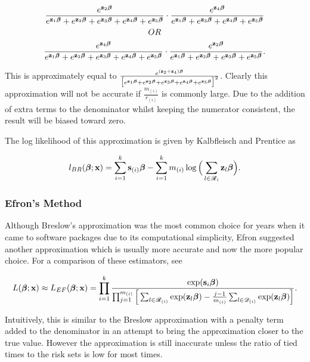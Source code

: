 \begin{gather*}
    \frac{e^{\textbf{z}_2\boldsymbol{\beta}}}{e^{\textbf{z}_1\boldsymbol{\beta}}+e^{\textbf{z}_2\boldsymbol{\beta}}+e^{\textbf{z}_3\boldsymbol{\beta}}+e^{\textbf{z}_4\boldsymbol{\beta}}+e^{\textbf{z}_5\boldsymbol{\beta}}}\cdot\frac{e^{\textbf{z}_4\boldsymbol{\beta}}}{e^{\textbf{z}_1\boldsymbol{\beta}}+e^{\textbf{z}_3\boldsymbol{\beta}}+e^{\textbf{z}_4\boldsymbol{\beta}}+e^{\textbf{z}_5\boldsymbol{\beta}}}\\
    OR\\
    \frac{e^{\textbf{z}_4\boldsymbol{\beta}}}{e^{\textbf{z}_1\boldsymbol{\beta}}+e^{\textbf{z}_2\boldsymbol{\beta}}+e^{\textbf{z}_3\boldsymbol{\beta}}+e^{\textbf{z}_4\boldsymbol{\beta}}+e^{\textbf{z}_5\boldsymbol{\beta}}}\cdot\frac{e^{\textbf{z}_2\boldsymbol{\beta}}}{e^{\textbf{z}_1\boldsymbol{\beta}}+e^{\textbf{z}_2\boldsymbol{\beta}}+e^{\textbf{z}_3\boldsymbol{\beta}}+e^{\textbf{z}_5\boldsymbol{\beta}}}.
\end{gather*}

This is approximately equal to $\frac{e^{(\textbf{z}_2+\textbf{z}_4)\boldsymbol{\beta}}}{\big[e^{\textbf{z}_1\boldsymbol{\beta}}+e^{\textbf{z}_2\boldsymbol{\beta}}+e^{\textbf{z}_3\boldsymbol{\beta}}+e^{\textbf{z}_4\boldsymbol{\beta}}+e^{\textbf{z}_5\boldsymbol{\beta}}\big]^2}$. Clearly this approximation will not be accurate if $\frac{m_{(i)}}{r_{(i)}}$ is commonly large. Due to the addition of extra terms to the denominator whilst keeping the numerator consistent, the result will be biased toward zero. 

The log likelihood of this approximation is given by Kalbfleisch and Prentice  as

\begin{equation}
    l_{BR}(\boldsymbol{\beta};\textbf{x})=\sum_{i=1}^{k}\textbf{s}_{(i)}\boldsymbol{\beta} - \sum_{i=1}^km_{(i)}\log\Big(\sum_{l\in\mathscr{R}_i}\textbf{z}_l\boldsymbol{\beta}\Big).
\end{equation}

\subsubsection{Efron's Method}

Although Breslow's approximation was the most common choice for years when it came to software packages due to its computational simplicity, Efron  suggested another approximation which is usually more accurate and now the more popular choice. For a comparison of these estimators, see 

\begin{equation}
    L(\boldsymbol{\beta};\textbf{x})\approx L_{EF}(\boldsymbol{\beta};\textbf{x})=\prod_{i=1}^k\frac{\exp(\textbf{s}_i\boldsymbol{\beta})}{\prod_{j=1}^{m_{(i)}}\Big[\sum_{l\in\mathscr{R}_{(i)}}\exp(\textbf{z}_l\boldsymbol{\beta})-\frac{j-1}{m_{(i)}}\sum_{l\in\mathscr{D}_{(i)}}\exp(\textbf{z}_l\boldsymbol{\beta})\Big]}.
\end{equation}

Intuitively, this is similar to the Breslow approximation with a penalty term added to the denominator in an attempt to bring the approximation closer to the true value. However the approximation is still inaccurate unless the ratio of tied times to the risk sets is low for most times.

